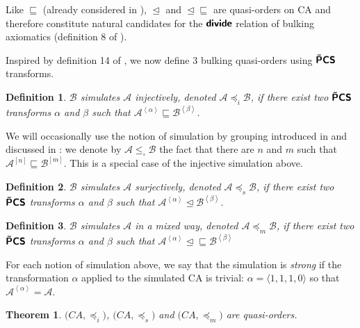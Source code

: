 \documentclass[a4paper]{elsarticle}
\def\qed{\relax\ifmmode\hskip2em \blacksquare\else\unskip\nobreak\hfill\hskip1em $\blacksquare$\fi}
\newcommand{\ACA}{\mathcal{A}}
\newcommand{\ACB}{\mathcal{B}}
\newcommand\sfbop[1]{\operatorname{\hbox{\usefont{T1}{cmss}{bx}{n}#1}}}
\newcommand\opdiv{\sfbop{divide}}
\newcommand\tPmCS{\sfbop{\~{P}CS}}
\newcommand\sac{\sqsubseteq}
\newcommand{\fac}{\trianglelefteq}
\newcommand{\facsac}{\fac\!\sac}
\newcommand\bulk[2]{{#1}^{\left\langle{#2}\right\rangle}}
\newcommand{\simu}{\preccurlyeq}
\newcommand{\sacsimu}{\simu_i}
\newcommand{\facsimu}{\simu_s}
\newcommand{\facsacsimu}{\simu_m}
\newcommand\grporder{\leqslant_\square}
\newcommand\grp[2]{{#1}^{[#2]}}
\newtheorem{defn}{Definition}[section]
\newtheorem{thm}{Theorem}[section]
\begin{document}
Like $\sac$ (already considered in \cite{bulking1}), $\fac$ and
$\facsac$ are quasi-orders on CA and therefore constitute natural
candidates for the $\opdiv$ relation of bulking axiomatics (definition
8 of \cite{bulking1}).

Inspired by definition 14 of \cite{bulking1}, we now define 3 bulking
quasi-orders using $\tPmCS$ transforms.  

\begin{defn}
  $\ACB$ simulates $\ACA$ \emph{injectively}, denoted
  ${\ACA\sacsimu\ACB}$, if there exist two $\tPmCS$ transforms
  $\alpha$ and $\beta$ such that
  ${\bulk{\ACA}{\alpha}\sac\bulk{\ACB}{\beta}}$.
\end{defn}

We will occasionally use the notion of simulation by grouping
introduced in \cite{Mazoyer:1999:IOC} and discussed in
\cite{bulking1}: we denote by ${\ACA\grporder\ACB}$ the fact that
there are $n$ and $m$ such that
${\grp{\ACA}{n}\sac\grp{\ACB}{m}}$. This is a special case of the
injective simulation above.

\begin{defn}
  $\ACB$ simulates $\ACA$ \emph{surjectively}, denoted
  ${\ACA\facsimu\ACB}$, if there exist two $\tPmCS$ transforms
  $\alpha$ and $\beta$ such that
  ${\bulk{\ACA}{\alpha}\fac\bulk{\ACB}{\beta}}$.
\end{defn}

\begin{defn}
  $\ACB$ simulates $\ACA$ in a mixed way, denoted
  ${\ACA\facsacsimu\ACB}$, if there exist two $\tPmCS$ transforms
  $\alpha$ and $\beta$ such that
  ${\bulk{\ACA}{\alpha}\facsac\bulk{\ACB}{\beta}}$
\end{defn}

For each notion of simulation above, we say that the simulation is
\emph{strong} if the transformation $\alpha$ applied to the simulated
CA is trivial: ${\alpha=\langle 1,1,1,0\rangle}$ so that
${\bulk{\ACA}{\alpha}=\ACA}$.

\begin{thm}
  $\bigl(CA,\sacsimu\bigr)$, $\bigl(CA,\facsimu\bigr)$ and
  $\bigl(CA,\facsacsimu\bigr)$ are quasi-orders.
\end{thm}
\end{document}
